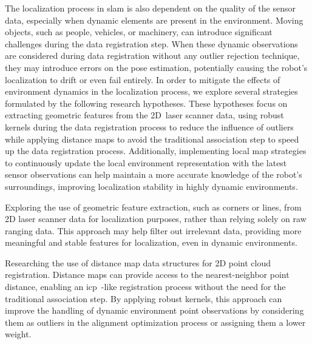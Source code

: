 The localization process in \gls{slam} is also dependent on the quality of the
sensor data, especially when dynamic elements are present in the environment.
Moving objects, such as people, vehicles, or machinery,
can introduce significant challenges during the data registration step.
When these dynamic observations are considered during data registration
without any outlier rejection technique, they may introduce errors on the pose
estimation, potentially causing the robot's localization to drift
or even fail entirely. In order to mitigate the effects of environment dynamics
in the localization process, we explore several strategies formulated by the
following research hypotheses. These hypotheses focus on extracting geometric
features from the 2D~laser scanner data, using robust kernels during the
data registration process to reduce the influence of outliers
while applying distance maps to avoid the traditional association step
to speed up the data registration process.
Additionally, implementing local map strategies to continuously update
the local environment representation with the latest sensor observations
can help maintain a more accurate knowledge of the robot's surroundings,
improving localization stability in highly dynamic environments.

\begin{hypothesis}\label{hypothesis:localization:features}
Exploring the use of geometric feature extraction, such as corners or lines,
from 2D laser scanner data for localization purposes,
rather than relying solely on raw ranging data.
This approach may help filter out irrelevant data, providing more meaningful and
stable features for localization, even in dynamic environments.
\end{hypothesis}

\begin{hypothesis}\label{hypothesis:localization:distance-maps}
Researching the use of distance map data structures for
2D point cloud registration. Distance maps can provide access to the
nearest-neighbor point distance, enabling an
\gls{icp}~\cite{besl-mckay:tpami:1992}-like registration process without the
need for the traditional association step. By applying robust kernels,
this approach can improve the handling of dynamic environment point observations
by considering them as outliers in the alignment optimization process
or assigning them a lower weight.
\end{hypothesis}

